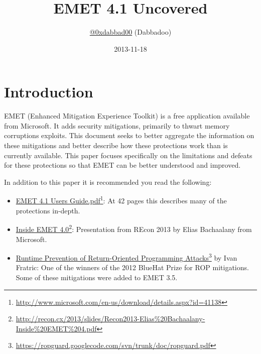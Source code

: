 \documentclass[]{article}
\title{EMET 4.1 Uncovered}
\author{\vspace{-1in} \href{https://twitter.com/0xdabbad00}{@0xdabbad00} (Dabbadoo)}
\date{2013-11-18}
\newcommand{\fhref}[2]{\href{#1}{#2}\footnote{\url{#1}}}
\begin{document}
\nocite{*}






\maketitle 
\thispagestyle{empty}







{
\hypersetup{linkcolor=black}
\setcounter{tocdepth}{2}
\def\addvspace#1{}
\tableofcontents
\vspace{12pt}
}
\clearpage






\section{Introduction}\label{introduction}

EMET (Enhanced Mitigation Experience Toolkit) is a free application available from Microsoft. It adds security mitigations, primarily to thwart memory corruptions exploits. This document seeks to better aggregate the information on these mitigations and better describe how these protections work than is currently available.  This paper focuses specifically on the limitations and defeats for these protections so that EMET can be better understood and improved.


In addition to this paper it is recommended you read the following:
\begin{itemize}
  \item \fhref{http://www.microsoft.com/en-us/download/details.aspx?id=41138}{EMET 4.1 Users Guide.pdf}\cite{userguide}: At 42 pages this describes many of the protections in-depth.
  
  \item \fhref{http://recon.cx/2013/slides/Recon2013-Elias\%20Bachaalany-Inside\%20EMET\%204.pdf}{Inside EMET 4.0}\cite{inside_emet}: Presentation from REcon 2013 by Elias Bachaalany from Microsoft.
  
  \item \fhref{https://ropguard.googlecode.com/svn/trunk/doc/ropguard.pdf}{Runtime Prevention of Return-Oriented Programming Attacks}\cite{ropguard_pdf} by Ivan Fratric: One of the winners of the 2012 BlueHat Prize for ROP mitigations. 
  Some of these mitigations were added to EMET 3.5.
\end{itemize}
\end{document}
